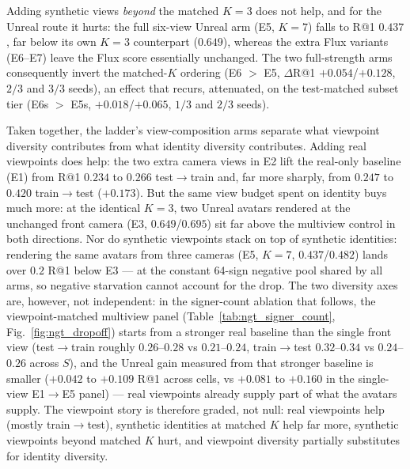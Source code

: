 Adding synthetic views \emph{beyond} the matched $K{=}3$ does not help, and for
the Unreal route it hurts: the full six-view Unreal arm (E5, $K{=}7$) falls to
R@1 $0.437$, far below its own $K{=}3$ counterpart ($0.649$), whereas the extra
Flux variants (E6--E7) leave the Flux score essentially unchanged. The two
full-strength arms consequently invert the matched-$K$ ordering (E6 $>$ E5,
$\Delta$R@1 $+0.054$/$+0.128$, $2/3$ and $3/3$ seeds), an effect that recurs,
attenuated, on the test-matched subset tier (E6s $>$ E5s, $+0.018$/$+0.065$,
$1/3$ and $2/3$ seeds).

Taken together, the ladder's view-composition arms separate what viewpoint
diversity contributes from what identity diversity contributes. Adding real
viewpoints does help: the two extra camera views in E2 lift the real-only
baseline (E1) from R@1 $0.234$ to $0.266$ test$\to$train and, far more sharply, from
$0.247$ to $0.420$ train$\to$test ($+0.173$). But the same view budget spent on
identity buys much more: at the identical $K{=}3$, two Unreal avatars
rendered at the unchanged front camera (E3, $0.649$/$0.695$) sit far above the
multiview control in both directions. Nor do synthetic viewpoints stack on
top of synthetic identities: rendering the same avatars from three cameras
(E5, $K{=}7$, $0.437$/$0.482$) lands over $0.2$ R@1 below E3 --- at
the constant 64-sign negative pool shared by all arms, so negative
starvation cannot account for the drop. The two diversity axes are, however,
not independent: in the signer-count ablation that follows, the
viewpoint-matched multiview panel (Table~\ref{tab:ngt_signer_count},
Fig.~\ref{fig:ngt_dropoff}) starts from a stronger real baseline than the
single front view (test$\to$train roughly $0.26$--$0.28$ vs $0.21$--$0.24$, train$\to$test
$0.32$--$0.34$ vs $0.24$--$0.26$ across $S$), and the Unreal gain measured from that
stronger baseline is smaller ($+0.042$ to $+0.109$ R@1 across cells, vs $+0.081$
to $+0.160$ in the single-view E1$\to$E5 panel) --- real viewpoints already supply part of what the
avatars supply. The viewpoint story is therefore graded, not null: real
viewpoints help (mostly train$\to$test), synthetic identities at matched $K$ help
far more, synthetic viewpoints beyond matched $K$ hurt, and viewpoint
diversity partially substitutes for identity diversity.



